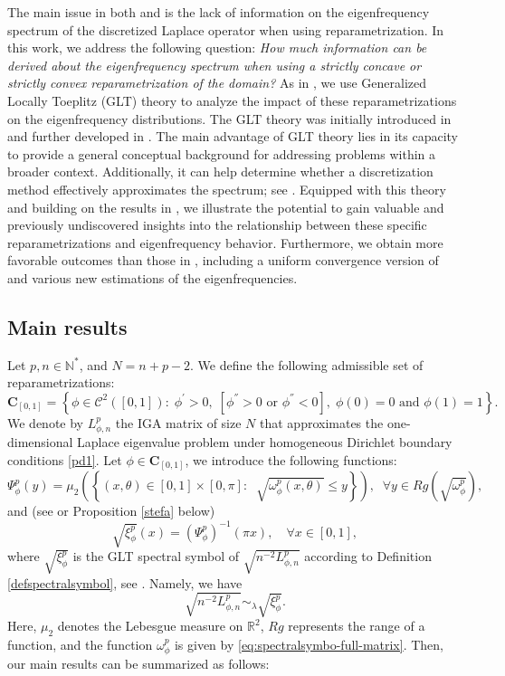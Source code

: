 \documentclass[11pt]{article}
\begin{document}
The main issue in both \cite{ervedoza2016numerical} and \cite{bianchi2018spectral} is the lack of information on the eigenfrequency spectrum of the discretized Laplace operator when using reparametrization. In this work, we address the following question: \textsl{How much information can be derived about the eigenfrequency spectrum when using a strictly concave or strictly convex reparametrization of the domain?} As in \cite{bianchi2018spectral}, we use Generalized Locally Toeplitz (GLT) theory to analyze the impact of these reparametrizations on the eigenfrequency distributions. The GLT theory was initially introduced in \cite{tilli1998locally} and further developed in \cite{capizzano2003generalized,serra2006glt}. The main advantage of GLT theory lies in its capacity to provide a general conceptual background for addressing problems within a broader context. Additionally, it can help determine whether a discretization method effectively approximates the spectrum; see \cite{garoni2019symbol,bianchi2021analysis}. Equipped with this theory and building on the results in \cite{bianchi2021analysis}, we illustrate the potential to gain valuable and previously undiscovered insights into the relationship between these specific reparametrizations and eigenfrequency behavior. Furthermore, we obtain more favorable outcomes than those in \cite{bianchi2021analysis}, including a uniform convergence version of \cite[Theorem 3.1]{bianchi2021analysis} and various new estimations of the eigenfrequencies.







\subsection{Main results}
Let \( p,n\in\mathbb{N}^* \), and \( N=n+p-2 \). We define the following admissible set of reparametrizations:  
\[
\mathbf{C}_{[0,1]}=\left\{ \phi\in\mathcal{C}^2([0,1]):\; \phi^{'}>0,\;[\phi^{''}>0 \text{ or }\phi^{''}<0],\; \phi(0)=0 \text{ and } \phi(1)=1       \right\}.
\]
We denote by \( L_{\phi,n}^p \) the IGA matrix of size \( N \) that approximates the one-dimensional Laplace eigenvalue problem under homogeneous Dirichlet boundary conditions \eqref{pd1}. Let \( \phi \in  \mathbf{C}_{[0,1]} \), we introduce the following functions:  
\[
    \Psi_{\phi}^{p}(y)=\mu_{2} \left( \left\{  (x,\theta)\in [0,1]\times[0,\pi]:\;\; \sqrt{\omega_{\phi}^p(x,\theta)}\leq y    \right\} \right),\;\;\forall y\in Rg\left({\sqrt{\omega_{\phi}^p}}\right),
\]
 and (see \cite{bianchi2018spectral} or Proposition \ref{stefa} below)  
\[
  \sqrt{\xi_{\phi}^p}(x)=\left(\Psi_{\phi}^{p}\right)^{-1}(\pi x),\quad \forall x\in[0,1],  
\]
where $\sqrt{\xi^p_{\phi}}$ is the GLT spectral symbol of $\sqrt{n^{-2}L_{\phi,n}^p}$ according to Definition \ref{defspectralsymbol}, see \cite{bianchi2018spectral}. Namely, we have 
\[
\sqrt{n^{-2}L_{\phi,n}^p}\sim_{\lambda}\sqrt{\xi^p_{\phi}}.
\]
Here, \( \mu_{2} \) denotes the Lebesgue measure on \( \mathbb{R}^{2} \), \( Rg \) represents the range of a function, and the function \( \omega^p_{\phi} \) is given by \eqref{eq:spectralsymbo-full-matrix}. Then, our main results can be summarized as follows:  
\end{document}
